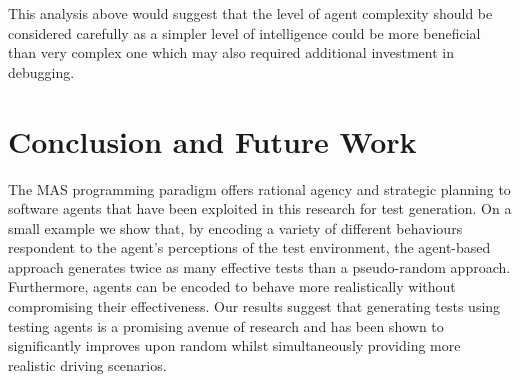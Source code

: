 \documentclass[letterpaper, 10 pt, journal, twoside]{IEEEtran}
\begin{document}
This analysis above would suggest that the level of agent complexity should be considered carefully as a simpler level of intelligence could be more beneficial than very complex one which may also required additional investment in debugging.





\section{Conclusion and Future Work}\label{s:conclusion}
The MAS programming paradigm offers rational agency and strategic planning to software agents that have been exploited in this research for test generation. 
%
On a small example we show that, by encoding a variety of different behaviours respondent to the agent's perceptions of the test environment, the agent-based approach generates twice as many effective tests than a pseudo-random approach. Furthermore, agents can be encoded to behave more realistically without compromising their effectiveness. %
Our results suggest that generating tests using testing agents is a promising avenue of research and has been shown to significantly improves upon random whilst simultaneously providing more realistic driving scenarios.
\end{document}
